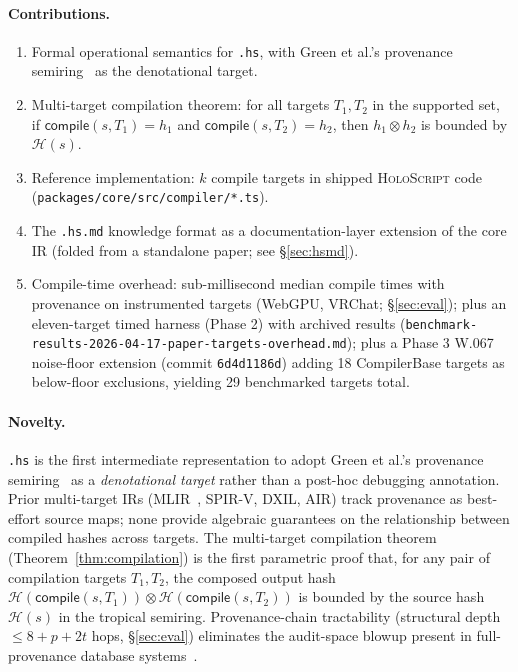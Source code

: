 \documentclass[sigconf,nonacm]{acmart}
\newcommand{\holoscript}{\textsc{HoloScript}}
\newcommand{\hscore}{\texttt{.hs}}
\newcommand{\hsmd}{\texttt{.hs.md}}
\newcommand{\hashfn}{\mathcal{H}}
\newcommand{\tropmult}{\otimes}
\newcommand{\compilefn}{\mathsf{compile}}
\begin{document}
\paragraph{Contributions.}
\begin{enumerate}
  \item Formal operational semantics for \hscore{}, with
    Green et al.'s provenance semiring~\cite{green-semiring2007}
    as the denotational target.
  \item Multi-target compilation theorem: for all targets
    $T_1, T_2$ in the supported set, if
    $\compilefn(s, T_1) = h_1$ and $\compilefn(s, T_2) = h_2$,
    then $h_1 \tropmult h_2$ is bounded by $\hashfn(s)$.
  \item Reference implementation: $k$ compile targets in shipped
    \holoscript{} code
    (\texttt{packages/core/src/compiler/*.ts}).
  \item The \hsmd{} knowledge format as a documentation-layer
    extension of the core IR (folded from a standalone paper;
    see \S\ref{sec:hsmd}).
  \item Compile-time overhead: sub-millisecond median compile times with
    provenance on instrumented targets (WebGPU, VRChat; \S\ref{sec:eval});
    plus an eleven-target timed harness (Phase 2) with archived results
    (\texttt{benchmark-results-2026-04-17-paper-targets-overhead.md});
    plus a Phase 3 W.067 noise-floor extension (commit \texttt{6d4d1186d}) adding 18
    CompilerBase targets as below-floor exclusions, yielding 29 benchmarked targets total.
\end{enumerate}

\paragraph{Novelty.}
\hscore{} is the first intermediate representation to adopt Green et al.'s
provenance semiring~\cite{green-semiring2007} as a \emph{denotational target}
rather than a post-hoc debugging annotation.  Prior multi-target IRs
(MLIR~\cite{mlir-lattner2020}, SPIR-V, DXIL, AIR) track provenance as
best-effort source maps; none provide algebraic guarantees on the
relationship between compiled hashes across targets.  The
multi-target compilation theorem (Theorem~\ref{thm:compilation}) is the
first parametric proof that, for any pair of compilation targets $T_1, T_2$,
the composed output hash $\hashfn(\compilefn(s,T_1))\tropmult\hashfn(\compilefn(s,T_2))$
is bounded by the source hash $\hashfn(s)$ in the tropical semiring.
Provenance-chain tractability (structural depth $\leq 8{+}p{+}2t$ hops,
\S\ref{sec:eval}) eliminates the audit-space blowup present in
full-provenance database systems~\cite{green-semiring2007}.
\end{document}
